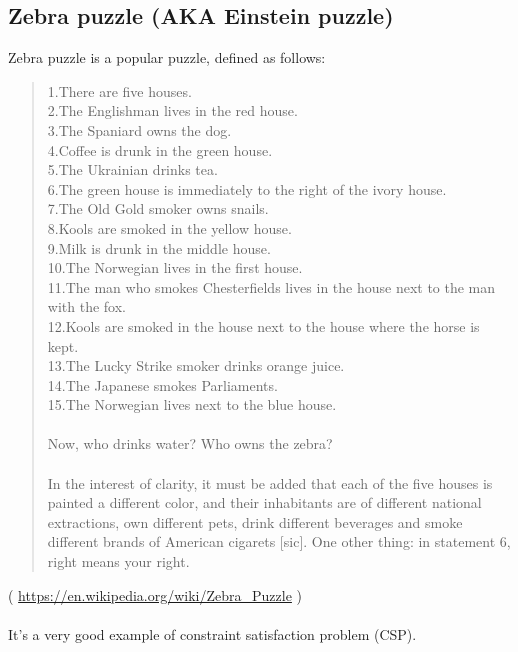 \subsection{Zebra puzzle (\ac{AKA} Einstein puzzle)}
\label{zebra_SMT}

Zebra puzzle is a popular puzzle, defined as follows:

\begin{framed}
\begin{quotation}
1.There are five houses.\\
2.The Englishman lives in the red house.\\
3.The Spaniard owns the dog.\\
4.Coffee is drunk in the green house.\\
5.The Ukrainian drinks tea.\\
6.The green house is immediately to the right of the ivory house.\\
7.The Old Gold smoker owns snails.\\
8.Kools are smoked in the yellow house.\\
9.Milk is drunk in the middle house.\\
10.The Norwegian lives in the first house.\\
11.The man who smokes Chesterfields lives in the house next to the man with the fox.\\
12.Kools are smoked in the house next to the house where the horse is kept.\\
13.The Lucky Strike smoker drinks orange juice.\\
14.The Japanese smokes Parliaments.\\
15.The Norwegian lives next to the blue house.\\
\\
Now, who drinks water? Who owns the zebra?\\
\\
In the interest of clarity, it must be added that each of the five houses is painted a different color, and their inhabitants are of different national extractions, own different pets, drink different beverages and smoke different brands of American cigarets [sic]. One other thing: in statement 6, right means your right.
\end{quotation}
\end{framed}
( \url{https://en.wikipedia.org/wiki/Zebra_Puzzle} ) \\
\\
It's a very good example of constraint satisfaction problem (CSP). %

